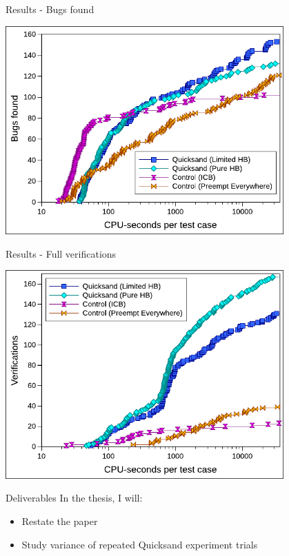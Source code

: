 \documentclass[xcolor=dvipsnames]{beamer}
\begin{document}
\begin{frame}{Results - Bugs found}
	\begin{center}
		\includegraphics[width=0.8\textwidth]{../../oopsla/bugs-talk.pdf}
	\end{center}
\end{frame}
\begin{frame}{Results - Full verifications}
	\begin{center}
		\includegraphics[width=0.8\textwidth]{../../oopsla/verifs-talk.pdf}
	\end{center}
\end{frame}

\begin{frame}{Deliverables}
	In the thesis, I will:
	\begin{itemize}
		\item Restate the paper {\large \smiley}
		\item Study variance of repeated Quicksand experiment trials
	\end{itemize}
\end{frame}
\end{document}
